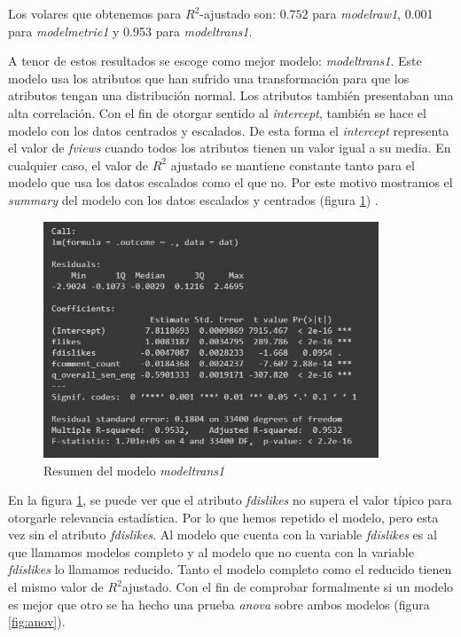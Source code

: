 \documentclass[a4paper,12pt]{article}
\begin{document}
Los volares que obtenemos para $R^{2}$-ajustado son: $0.752$ para {\itshape model{\textunderscore}raw{\textunderscore}1}, 0.001 para  {\itshape model{\textunderscore}metric{\textunderscore}1} y 0.953 para  {\itshape model{\textunderscore}trans{\textunderscore}1}.

A tenor de estos resultados se escoge como mejor modelo: {\itshape model{\textunderscore}trans{\textunderscore}1}. Este modelo usa los atributos que han sufrido una transformaci\'on para que los atributos tengan una distribuci\'on normal. Los atributos tambi\'en presentaban una alta correlaci\'on. Con el fin de otorgar sentido al {\itshape intercept}, tambi\'en se hace el modelo con los datos centrados y escalados. De esta forma el {\itshape intercept} representa el valor de {\itshape fviews} cuando todos los atributos tienen un valor igual a su media. En cualquier caso, el valor de $R^{2}$ ajustado se mantiene constante tanto para el modelo que usa los datos escalados como el que no. Por este motivo mostramos el {\itshape summary} del modelo con los datos escalados y centrados (figura \ref{fig:summ}) .

\begin{figure}[h!]
\centering
\includegraphics[width=10cm]{summa.JPG}
\caption{Resumen del modelo {\itshape model{\textunderscore}trans{\textunderscore}1}}
\label{fig:summ}
\end{figure}


En la figura  \ref{fig:summ}, se puede ver que el atributo {\itshape fdislikes} no supera el valor t\'ipico para otorgarle relevancia estad\'istica. Por lo que hemos repetido el modelo, pero esta vez sin el atributo {\itshape fdislikes}. Al modelo que cuenta con la variable {\itshape fdislikes} es al que llamamos modelos completo y al modelo que no cuenta con la variable {\itshape fdislikes} lo llamamos reducido. Tanto el modelo completo como el reducido tienen el mismo valor de $R^{2}$ajustado. Con el fin de comprobar formalmente si un modelo es mejor que otro se ha hecho una prueba {\itshape anova} sobre ambos modelos (figura \ref{fig:anov}).
\end{document}
